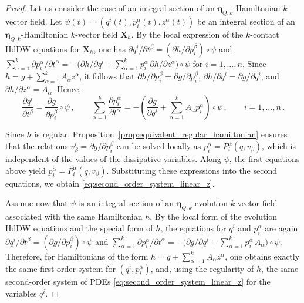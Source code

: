 \documentclass[11pt,twoside]{article}
\theoremstyle{plain}
\theoremstyle{definition}
\theoremstyle{remark}
\begin{document}
\begin{proof}
Let us consider the case of an integral section of an ${\bm\eta}_{Q,k}$-Hamiltonian $k$-vector field. 
Let \(\psi(t)=(q^i(t),p_i^\alpha(t),z^\alpha(t))\) be an integral section of an \({\bm\eta}_{Q,k}\)-Hamiltonian \(k\)-vector field ${\bm X}_h$. By the local expression of the \(k\)-contact HdDW equations for ${\bm X}_h$, one has \(\partial q^i/\partial t^\beta=(\partial h/\partial p_i^\beta)\circ\psi\) and \(\sum_{\alpha=1}^k\partial p_i^\alpha/\partial t^\alpha=-\bigl(\partial h/\partial q^i+\sum_{\alpha=1}^k p_i^\alpha\,\partial h/\partial z^\alpha\bigr)\circ\psi\) for $i=1,\dotsc,n$. Since \(h=g+\sum_{\alpha=1}^kA_\alpha z^\alpha\), it follows that \(\partial h/\partial p_i^\beta=\partial g/\partial p_i^\beta\), \(\partial h/\partial q^i=\partial g/\partial q^i\), and \(\partial h/\partial z^\alpha=A_\alpha\). Hence,
\[
\frac{\partial q^i}{\partial t^\beta}=\frac{\partial g}{\partial p_i^\beta}\circ\psi\,,
\qquad 
\sum_{\alpha=1}^k\frac{\partial p_i^\alpha}{\partial t^\alpha}
=
-\left(\frac{\partial g}{\partial q^i}+\sum_{\alpha=1}^k A_\alpha p_i^\alpha\right)\circ\psi\,,\qquad i=1,\dotsc,n\,.
\]

Since \(h\) is regular, Proposition~\ref{prop:equivalent_regular_hamiltonian} ensures that the relations \(v_\beta^i=\partial g/\partial p_i^\beta\) can be solved locally as \(p_i^\alpha=P_i^\alpha(q,v_\beta)\), which is independent of the values of the dissipative variables. Along \(\psi\), the first equations above yield \(p_i^\alpha=P_i^\alpha(q,v_\beta)\). Substituting these expressions into the second equations, we obtain \eqref{eq:second_order_system_linear_z}.

Assume now that \(\psi\) is an integral section of an \(\bm\eta_{Q,k}\)-evolution $k$-vector field associated with the same Hamiltonian \(h\). By the local form of the evolution HdDW equations and the special form of $h$, the equations for \(q^i\) and \(p_i^\alpha\) are again \(\partial q^i/\partial t^\beta=(\partial g/\partial p_i^\beta)\circ\psi\) and \(\sum_{\alpha=1}^k\partial p_i^\alpha/\partial t^\alpha=-\bigl(\partial g/\partial q^i+\sum_{\alpha=1}^k p_i^\alpha\,A_\alpha\bigr)\circ\psi\). Therefore, for Hamiltonians of the form \(h=g+\sum_{\alpha=1}^kA_\alpha z^\alpha\), one obtains exactly the same first-order system for \((q^i,p_i^\alpha)\), and, using the regularity of $h$, the same second-order system of PDEs \eqref{eq:second_order_system_linear_z} for the variables \(q^i\). 
\end{proof}
\end{document}
